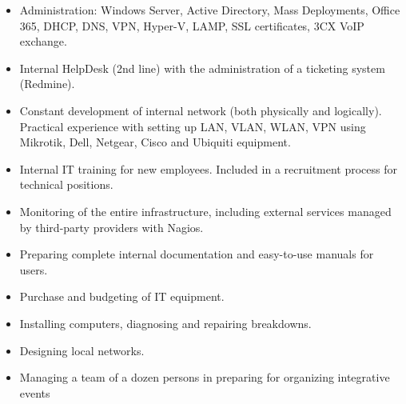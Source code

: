 \documentclass[10pt,a4paper]{altacv}
\begin{document}
\begin{itemize}
\item Administration: Windows Server, Active Directory, Mass Deployments, Office 365, DHCP, DNS, VPN, Hyper-V, LAMP, SSL certificates, 3CX VoIP exchange.
\item Internal HelpDesk (2nd line) with the administration of a ticketing system (Redmine).
\item Constant development of internal network (both physically and logically). Practical experience with setting up LAN, VLAN, WLAN, VPN using Mikrotik, Dell, Netgear, Cisco and Ubiquiti equipment.
\item Internal IT training for new employees. Included in a recruitment process for technical positions.
\item Monitoring of the entire infrastructure, including external services managed by third-party providers with Nagios.
\item Preparing complete internal documentation and easy-to-use manuals for users.
\item Purchase and budgeting of IT equipment.
\end{itemize}
\begin{itemize}
\item Installing computers, diagnosing and repairing breakdowns.
\item Designing local networks.
\end{itemize}
\begin{itemize}
\item Managing a team of a dozen persons in preparing for organizing integrative events
\end{itemize}

\divider
\end{document}
